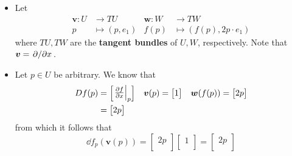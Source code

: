 \documentclass[../notes.tex]{subfiles}
\begin{document}
\begin{itemize}
\begin{itemize}
        \begin{itemize}
            \item Let
            \begin{align*}
                \bm{v}:U &\to TU&
                    \bm{w}:W &\to TW\\
                p &\mapsto (p,e_1)&
                    f(p) &\mapsto (f(p),2p\cdot e_1)
            \end{align*}
            where $TU,TW$ are the \textbf{tangent bundles} of $U,W$, respectively. Note that $\bm{v}=\pdv*{x}$.
            \item Let $p\in U$ be arbitrary. We know that
            \begin{align*}
                Df(p) &=
                \begin{bmatrix}
                    \eval{\pdv{f}{x}}_p\\
                \end{bmatrix}&
                    \bm{v}(p) &=
                    \begin{bmatrix}
                        1\\
                    \end{bmatrix}&
                        \bm{w}(f(p)) &=
                        \begin{bmatrix}
                            2p\\
                        \end{bmatrix}\\
                &=
                \begin{bmatrix}
                    2p\\
                \end{bmatrix}
            \end{align*}
            from which it follows that
            \begin{equation*}
                \dd f_p(\bm{v}(p)) =
                \begin{bmatrix}
                    2p\\
                \end{bmatrix}
                \begin{bmatrix}
                    1\\
                \end{bmatrix}
                =
                \begin{bmatrix}
                    2p\\
                \end{bmatrix}

\end{equation*}
\end{itemize}
\end{itemize}
\end{itemize}
\end{document}
